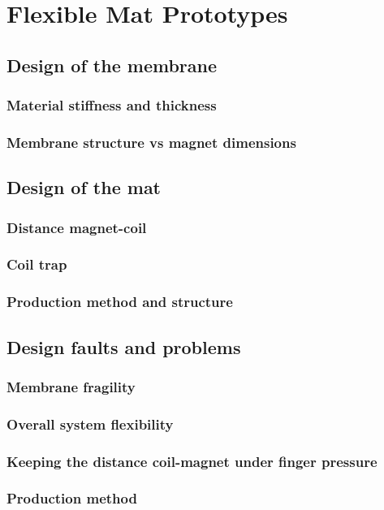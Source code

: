 \section{Flexible Mat Prototypes}
\label{sec: Flexible_Mat_Prototypes}

\subsection{Design of the membrane}

\subsubsection{Material stiffness and thickness}

\subsubsection{Membrane structure vs magnet dimensions}


\subsection{Design of the mat}

\subsubsection{Distance magnet-coil}

\subsubsection{Coil trap}

\subsubsection{Production method and structure}


\subsection{Design faults and problems}

\subsubsection{Membrane fragility}

\subsubsection{Overall system flexibility}

\subsubsection{Keeping the distance coil-magnet under finger pressure}

\subsubsection{Production method}